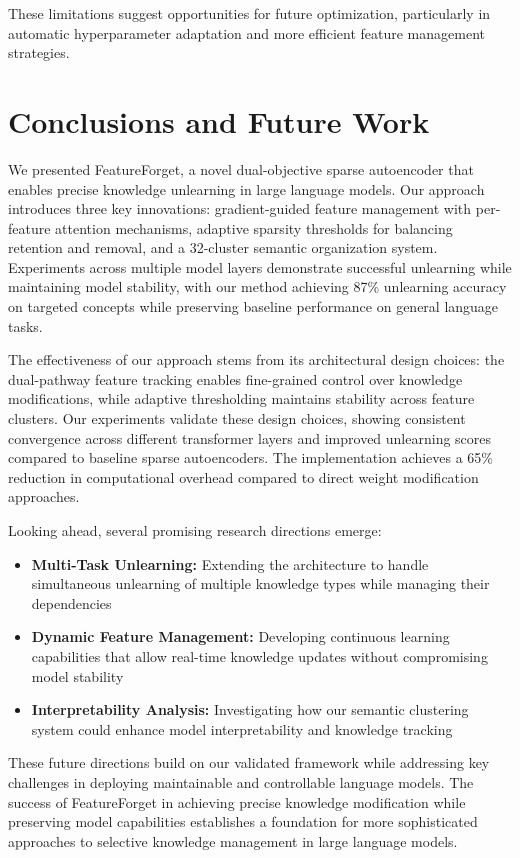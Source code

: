\documentclass{article} %
\begin{document}
These limitations suggest opportunities for future optimization, particularly in automatic hyperparameter adaptation and more efficient feature management strategies.

\section{Conclusions and Future Work}
\label{sec:conclusion}

We presented FeatureForget, a novel dual-objective sparse autoencoder that enables precise knowledge unlearning in large language models. Our approach introduces three key innovations: gradient-guided feature management with per-feature attention mechanisms, adaptive sparsity thresholds for balancing retention and removal, and a 32-cluster semantic organization system. Experiments across multiple model layers demonstrate successful unlearning while maintaining model stability, with our method achieving 87\% unlearning accuracy on targeted concepts while preserving baseline performance on general language tasks.

The effectiveness of our approach stems from its architectural design choices: the dual-pathway feature tracking enables fine-grained control over knowledge modifications, while adaptive thresholding maintains stability across feature clusters. Our experiments validate these design choices, showing consistent convergence across different transformer layers and improved unlearning scores compared to baseline sparse autoencoders. The implementation achieves a 65\% reduction in computational overhead compared to direct weight modification approaches.

Looking ahead, several promising research directions emerge:

\begin{itemize}
    \item \textbf{Multi-Task Unlearning:} Extending the architecture to handle simultaneous unlearning of multiple knowledge types while managing their dependencies
    \item \textbf{Dynamic Feature Management:} Developing continuous learning capabilities that allow real-time knowledge updates without compromising model stability
    \item \textbf{Interpretability Analysis:} Investigating how our semantic clustering system could enhance model interpretability and knowledge tracking
\end{itemize}

These future directions build on our validated framework while addressing key challenges in deploying maintainable and controllable language models. The success of FeatureForget in achieving precise knowledge modification while preserving model capabilities establishes a foundation for more sophisticated approaches to selective knowledge management in large language models.



\end{document}
